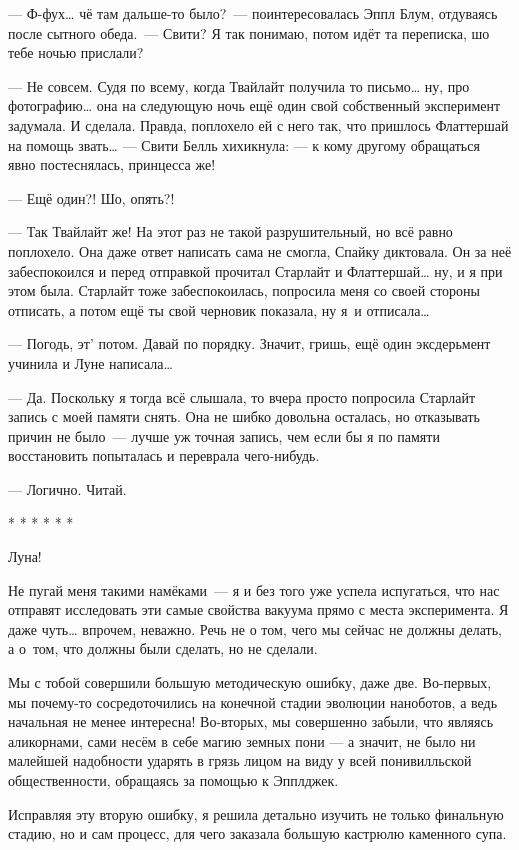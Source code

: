 \documentclass[fontsize=11pt,a5paper,titlepage=firstcover]{scrbook}
\begin{document}
--- Ф-фух{\ldots} чё там дальше-то было?~--- поинтересовалась Эппл Блум, отдуваясь после сытного обеда.~--- Свити? Я так понимаю, потом идёт та переписка, шо тебе ночью прислали?

--- Не совсем. Судя по всему, когда Твайлайт получила то письмо{\ldots} ну, про фотографию{\ldots} она на следующую ночь ещё один свой собственный эксперимент задумала. И сделала. Правда, поплохело ей с него так, что пришлось Флаттершай на помощь звать{\ldots} --- Свити Белль хихикнула: --- к кому другому обращаться явно постеснялась, принцесса же!

--- Ещё один?! Шо, опять?!

--- Так Твайлайт же! На этот раз не такой разрушительный, но всё равно поплохело. Она даже ответ написать сама не смогла, Спайку диктовала. Он за неё забеспокоился и перед отправкой прочитал Старлайт и Флаттершай{\ldots} ну, и я при этом была. Старлайт тоже забеспокоилась, попросила меня со своей стороны отписать, а потом ещё ты свой черновик показала, ну я~и отписала{\ldots}

--- Погодь, эт’ потом. Давай по порядку. Значит, гришь, ещё один эксдерьмент учинила и Луне написала{\ldots}

--- Да. Поскольку я тогда всё слышала, то вчера просто попросила Старлайт запись с моей памяти снять. Она не шибко довольна осталась, но отказывать причин не было~--- лучше уж точная запись, чем если бы я по памяти восстановить попыталась и переврала чего-нибудь.

--- Логично. Читай.
\begin{center}
	* * * * * *
\end{center}

Луна!

Не пугай меня такими намёками~--- я и без того уже успела испугаться, что нас отправят исследовать эти самые свойства вакуума прямо с места эксперимента. Я даже чуть{\ldots} впрочем, неважно. Речь не о том, чего мы сейчас не должны делать, а о~том, что должны были сделать, но не сделали.

Мы с тобой совершили большую методическую ошибку, даже две. Во-первых, мы почему-то сосредоточились на конечной стадии эволюции наноботов, а ведь начальная не менее интересна! Во-вторых, мы совершенно забыли, что являясь аликорнами, сами несём в себе магию земных пони --- а значит, не было ни малейшей надобности ударять в грязь лицом на виду у всей понивилльской общественности, обращаясь за помощью к Эпплджек.

Исправляя эту вторую ошибку, я решила детально изучить не только финальную стадию, но и сам процесс, для чего заказала большую кастрюлю каменного супа.
\end{document}

